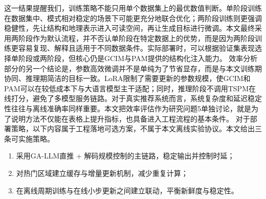 这一结果提醒我们，训练策略不能只用单个数据集上的最优数值判断。单阶段训练在数据集中、模式相对稳定的场景下可能更充分地联合优化；两阶段训练则更强调稳健性，先让结构和地理表示进入可读空间，再让生成目标进行微调。本文最终采用两阶段作为默认流程，并不否认单阶段在特定数据上的优势，而是因为两阶段训练更容易复现、解释且适用于不同数据条件。实际部署时，可以根据验证集表现选择单阶段或两阶段，但核心仍是GCIM与PAM提供的结构化注入能力。
效率分析部分的另一个结论是，参数高效微调并不是单纯为了节省显存，而是与本文训练期协同、推理期简洁的目标一致。LoRA限制了需要更新的参数规模，使GCIM和PAM可以在较低成本下与大语言模型主干适配；同时，推理阶段不调用TSPM在线打分，避免了多模型服务链路。对于真实推荐系统而言，系统复杂度和延迟稳定性往往与离线准确率同样重要。本文把效率评估作为研究问题5单独讨论，就是为了说明方法不仅能在表格上提升指标，也具备进入工程流程的基本条件。
对于部署策略，以下内容属于工程落地可选方案，不属于本文离线实验协议。本文给出三条可实施策略。
\begin{enumerate}
    \item 采用GA-LLM直推 + 解码规模控制的主链路，稳定输出并控制时延；
    \item 对热门区域建立缓存与增量更新机制，减少重复计算；
    \item 在离线周期训练与在线小步更新之间建立联动，平衡新鲜度与稳定性。
\end{enumerate}

